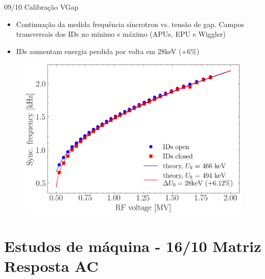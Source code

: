 \documentclass{beamer}					  %
\begin{document}
\begin{frame}{09/10 Calibração VGap}
    \begin{itemize}
		\item Continuação da medida frequência síncrotron vs. tensão de gap. Campos transversais dos IDs no mínimo e máximo (APUs, EPU e Wiggler)
        \item IDs aumentam energia perdida por volta em 28keV (+6\%)
	\end{itemize}
    \begin{figure}[H]
		\centering
        \includegraphics[width=.7\textwidth]{2023-10-27/figures/sync_freq_vs_gap_voltage_ids_variation.png}
        \label{fig:vgap}
    \end{figure}
\end{frame}



\section{Estudos de máquina - 16/10 Matriz Resposta AC}
\end{document}
